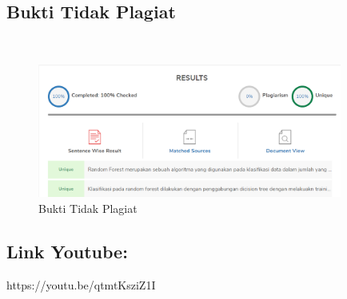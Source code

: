 \subsection{Bukti Tidak Plagiat}
\hfill\\
\begin{figure}[H]
\centerline{\includegraphics[width=10cm]{figures/1174084/3/plagiat.png}}
\caption{Bukti Tidak Plagiat}
\label{labelgambar}
\end{figure}

\subsection{Link Youtube:}
https://youtu.be/qtmtKsziZ1I